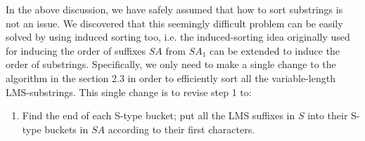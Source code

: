 \documentclass{article}
\begin{document}
In the above discussion, we have safely assumed that how to sort substrings is not an issue. We discovered that this seemingly difficult problem can be easily solved by using induced sorting too, i.e. the induced-sorting idea originally used for inducing the order of suffixes $SA$ from $SA_1$ can be extended to induce the order of substrings. Specifically, we only need to make a single change to the algorithm in the section 2.3 in order to efficiently sort all the variable-length LMS-substrings. This single change is to revise step 1 to: 
\begin{enumerate}
\item Find the end of each S-type bucket; put all the LMS suffixes in $S$ into their S-type buckets in $SA$ according to their first characters.
\end{enumerate}
\end{document}
